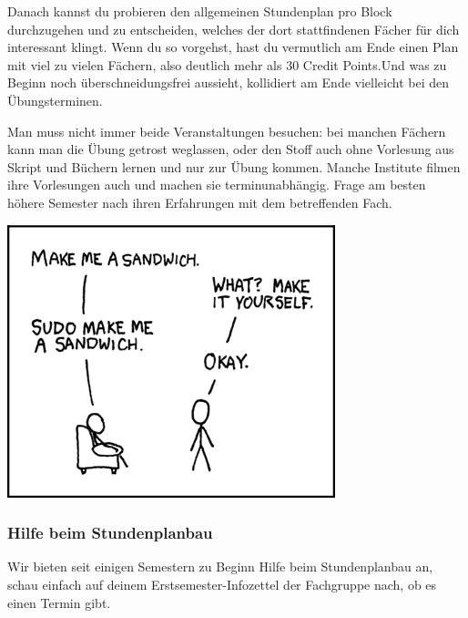 \begin{multicols}{2}
		Danach kannst du probieren den allgemeinen Stundenplan pro Block durchzugehen und zu entscheiden, welches der dort stattfindenen Fächer für dich interessant klingt. Wenn du so vorgehst, hast du vermutlich am Ende einen Plan mit viel zu vielen Fächern, also deutlich mehr als 30 Credit Points.Und was zu Beginn noch überschneidungsfrei aussieht, kollidiert am Ende vielleicht bei den Übungsterminen. 

		Man muss nicht immer beide Veranstaltungen besuchen: bei manchen Fächern kann man die Übung getrost weglassen, oder den Stoff auch ohne Vorlesung aus Skript und Büchern lernen und nur zur Übung kommen. Manche Institute filmen ihre Vorlesungen auch und machen sie terminunabhängig. Frage am besten höhere Semester nach ihren Erfahrungen mit dem betreffenden Fach.

		\vspace{0.5cm}
		\includegraphics[totalheight=6cm]{bilder/XKCD/sandwich}
	\subsubsection{Hilfe beim Stundenplanbau}
		Wir bieten seit einigen Semestern zu Beginn Hilfe beim Stundenplanbau an, schau einfach auf deinem Erstsemester-Infozettel der Fachgruppe nach, ob es einen Termin gibt.
\end{multicols}
